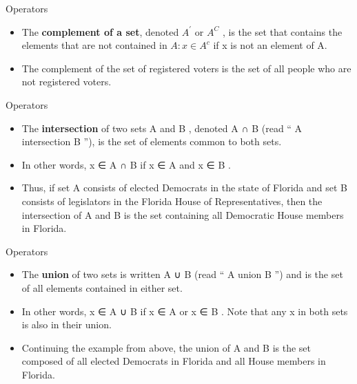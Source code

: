\documentclass[
  ignorenonframetext,
]{beamer}
\begin{document}
\begin{frame}{Operators}
\protect\hypertarget{operators-4}{}

\begin{itemize}
\item
  The \textbf{complement of a set}, denoted \(A^{'}\) or \(A^{C}\) , is
  the set that contains the elements that are not contained in
  \(A: x \in A^{c}\) if x is not an element of A.
\item
  The complement of the set of registered voters is the set of all
  people who are not registered voters.
\end{itemize}

\end{frame}

\begin{frame}{Operators}
\protect\hypertarget{operators-5}{}

\begin{itemize}
\item
  The \textbf{intersection} of two sets A and B , denoted A ∩ B (read ``
  A intersection B ''), is the set of elements common to both sets.
\item
  In other words, x ∈ A ∩ B if x ∈ A and x ∈ B .
\item
  Thus, if set A consists of elected Democrats in the state of Florida
  and set B consists of legislators in the Florida House of
  Representatives, then the intersection of A and B is the set
  containing all Democratic House members in Florida.
\end{itemize}

\end{frame}

\begin{frame}{Operators}
\protect\hypertarget{operators-6}{}

\begin{itemize}
\item
  The \textbf{union} of two sets is written A ∪ B (read `` A union B '')
  and is the set of all elements contained in either set.
\item
  In other words, x ∈ A ∪ B if x ∈ A or x ∈ B . Note that any x in both
  sets is also in their union.
\item
  Continuing the example from above, the union of A and B is the set
  composed of all elected Democrats in Florida and all House members in
  Florida.
\end{itemize}

\end{frame}
\end{document}
